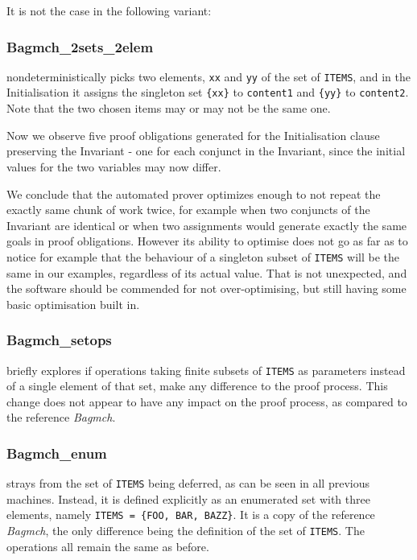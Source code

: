 \documentclass[11pt,journal]{IEEEtran}
\begin{document}
	It is not the case in the following variant:
	
	\subsubsection{Bagmch\_2sets\_2elem} nondeterministically picks two elements, \texttt{xx} and \texttt{yy} of the set of \texttt{ITEMS}, and in the Initialisation it assigns the singleton set \texttt{\{xx\}} to \texttt{content1} and \texttt{\{yy\}} to \texttt{content2}. Note that the two chosen items may or may not be the same one. 
	
	Now we observe five proof obligations generated for the Initialisation clause preserving the Invariant - one for each conjunct in the Invariant, since the initial values for the two variables may now differ.
	
	We conclude that the automated prover optimizes enough to not repeat the exactly same chunk of work twice, for example when two conjuncts of the Invariant are identical or when two assignments would generate exactly the same goals in proof obligations. However its ability to optimise does not go as far as to notice for example that the behaviour of a singleton subset of \texttt{ITEMS} will be the same in our examples, regardless of its actual value. That is not unexpected, and the software should be commended for not over-optimising, but still having some basic optimisation built in.
	
	\subsubsection{Bagmch\_setops} briefly explores if operations taking finite subsets of \texttt{ITEMS} as parameters instead of a single element of that set, make any difference to the proof process. This change does not appear to have any impact on the proof process, as compared to the reference \emph{Bagmch}.
	
	\subsubsection{Bagmch\_enum} strays from the set of \texttt{ITEMS} being deferred, as can be seen in all previous machines. Instead, it is defined explicitly as an enumerated set with three elements, namely \texttt{ITEMS = \{FOO, BAR, BAZZ\}}. It is a copy of the reference \emph{Bagmch}, the only difference being the definition of the set of \texttt{ITEMS}. The operations all remain the same as before.
	
\end{document}
